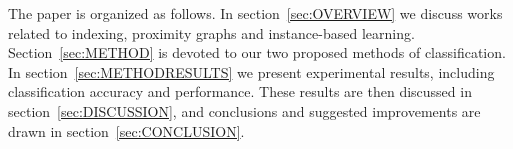 The paper is organized as follows.
In section~\ref{sec:OVERVIEW} we discuss works related to indexing, proximity graphs and instance-based learning.
Section~\ref{sec:METHOD} is devoted to our two proposed methods of classification.
In section~\ref{sec:METHODRESULTS} we present experimental results, including classification accuracy and performance.
These results are then discussed in section~\ref{sec:DISCUSSION},
and conclusions and suggested improvements are drawn in section~\ref{sec:CONCLUSION}.
